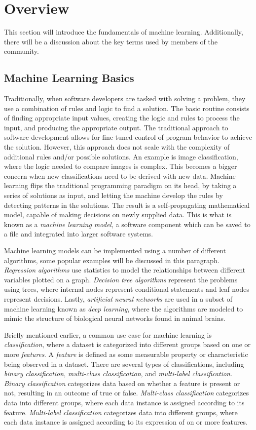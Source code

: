 \documentclass[11pt,conference]{IEEEtran}
\begin{document}
\section{Overview}
This section will introduce the fundamentals of machine learning. Additionally,
there will be a discussion about the key terms used by members of the community.

\subsection{Machine Learning Basics}
Traditionally, when software developers are tasked with solving a problem, they
use a combination of rules and logic to find a solution. The basic
routine consists of finding appropriate input values,
creating the logic and rules to process the input, and producing the appropriate output.
The traditional approach to software development allows for fine-tuned control
of program behavior to achieve the solution. However, this approach does not scale
with the complexity of additional rules and/or possible solutions. An
example is image classification, where the logic needed to compare images
is complex. This becomes a bigger concern when new classifications need to be
derived with new data. Machine learning flips the traditional programming
paradigm on its head, by taking a series of solutions as input, and
letting the machine develop the rules by detecting patterns in the solutions.
The result is a self-propagating mathematical model, capable of making
decisions on newly supplied data. This is what is known as a \emph{machine
learning model}, a software component which can be saved to a file and
integrated into larger software systems.

Machine learning models can be implemented using a number of different
algorithms, some popular examples will be discussed in this paragraph. \emph{Regression algorithms} use statistics to model the
relationships between different variables plotted on a graph. \emph{Decision
tree algorithms} represent the problems using trees, where internal nodes represent conditional statements and leaf nodes
represent decisions. Lastly, \emph{artificial neural networks} are used in a
subset of machine learning known as \emph{deep learning}, where the algorithms
are modeled to mimic the structure of biological neural networks found in
animal brains.  

Briefly mentioned earlier, a common use case for machine learning is
\emph{classification}, where a dataset is categorized into different groups
based on one or more \emph{features}. A \emph{feature} is defined as some
measurable property or characteristic being observed in a dataset. There are several types of
classifications, including \emph{binary classification}, \emph{multi-class
classification}, and \emph{multi-label classification}. \emph{Binary
classification} categorizes data based on whether a feature is present or not,
resulting in an outcome of true or false. \emph{Multi-class classification}
categorizes data into different groups, where each data instance is assigned
according to its feature. \emph{Multi-label classification} categorizes data
into different groups, where each data instance is assigned according to its
expression of on or more features.
\end{document}
